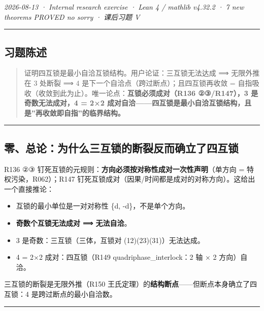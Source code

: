 \documentclass[
]{article}
\providecommand{\tightlist}{%
 \setlength{\itemsep}{0pt}\setlength{\parskip}{0pt}}
\begin{document}
\emph{2026-08-13 · Internal research exercise · Lean 4 / mathlib v4.32.2
· 7 new theorems PROVED no sorry · 课后习题 V }

\begin{center}\rule{0.5\linewidth}{0.5pt}\end{center}

\subsection{习题陈述}\label{ux4e60ux9898ux9648ux8ff0}

\begin{quote}
证明四互锁是最小自洽互锁结构。用户论证：三互锁无法达成 ⟹ 无限外推在 3
处断裂 ⟹ 4 是下一个自洽点（跨过断点）；且四互锁再收敛 =
自指吸收（收敛到此为止）。唯一论点：\textbf{互锁必须成对（R136
②③/R147），3 是奇数无法成对，4 = 2×2
成对自洽------四互锁是最小自洽互锁结构，且是''再收敛即自指''的临界结构。}
\end{quote}

\begin{center}\rule{0.5\linewidth}{0.5pt}\end{center}

\subsection{零、总论：为什么三互锁的断裂反而确立了四互锁}\label{ux96f6ux603bux8bbaux4e3aux4ec0ux4e48ux4e09ux4e92ux9501ux7684ux65adux88c2ux53cdux800cux786eux7acbux4e86ux56dbux4e92ux9501}

 R136 ②③
钉死互锁的元规则：\textbf{方向必须按对称性成对一次性声明}（单方向 =
特权污染，R062）；R147
钉死互锁成对（因果/时间都是成对的对称方向）。这给出一个直接推论：

\begin{itemize}
\tightlist
\item
 互锁的最小单位是一对对称性 \{d, -d\}，不是单个方向。
\item
 \textbf{奇数个互锁无法成对 ⟹ 无法自洽}。
\item
 3 是奇数：三互锁（三体，互锁对 (12)(23)(31)）无法达成。
\item
 4 = 2×2 成对：四互锁（R149 quadriphase\_interlock：2 轴 × 2
 方向）自洽。
\end{itemize}

三互锁的断裂是无限外推（R150
王氏定理）的\textbf{结构断点}------但断点本身确立了四互锁：4
是跨过断点的最小自洽数。

\begin{center}\rule{0.5\linewidth}{0.5pt}\end{center}
\end{document}
